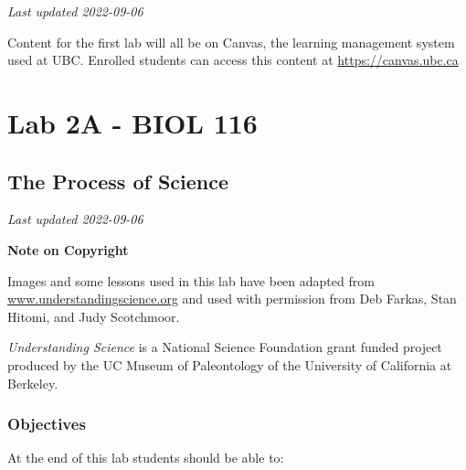 \documentclass[
]{book}
\begin{document}
\emph{Last updated 2022-09-06}

Content for the first lab will all be on Canvas, the learning management system used at UBC. Enrolled students can access this content at \url{https://canvas.ubc.ca}

\hypertarget{part-lab-2a---biol-116}{%
\part*{Lab 2A - BIOL 116}\label{part-lab-2a---biol-116}}

\hypertarget{the-process-of-science}{%
\chapter*{The Process of Science}\label{the-process-of-science}}

\emph{Last updated 2022-09-06}

\textbf{Note on Copyright}

Images and some lessons used in this lab have been adapted from \href{http://www.understandingscience.org/}{www.understandingscience.org} and used with permission from Deb Farkas, Stan Hitomi, and Judy Scotchmoor.

\emph{Understanding Science} is a National Science Foundation grant funded project produced by the UC Museum of Paleontology of the University of California at Berkeley.

\hypertarget{objectives}{%
\section*{Objectives}\label{objectives}}

At the end of this lab students should be able to:
\end{document}
